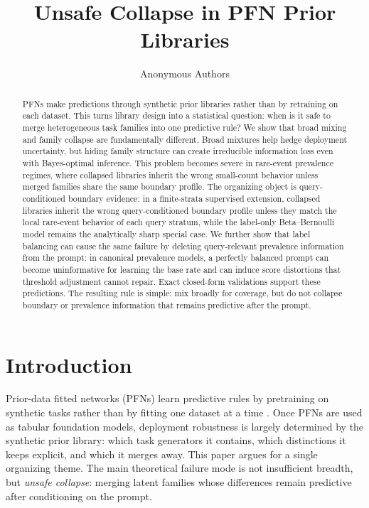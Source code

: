 \documentclass{article}
\title{Unsafe Collapse in PFN Prior Libraries}
\author{Anonymous Authors}
\theoremstyle{definition}
\theoremstyle{remark}
\begin{document}
\maketitle

\begin{abstract}
PFNs make predictions through synthetic prior libraries rather than by retraining on each dataset. This turns library design into a statistical question: when is it safe to merge heterogeneous task families into one predictive rule? We show that broad mixing and family collapse are fundamentally different. Broad mixtures help hedge deployment uncertainty, but hiding family structure can create irreducible information loss even with Bayes-optimal inference. This problem becomes severe in rare-event prevalence regimes, where collapsed libraries inherit the wrong small-count behavior unless merged families share the same boundary profile. The organizing object is query-conditioned boundary evidence: in a finite-strata supervised extension, collapsed libraries inherit the wrong query-conditioned boundary profile unless they match the local rare-event behavior of each query stratum, while the label-only Beta--Bernoulli model remains the analytically sharp special case. We further show that label balancing can cause the same failure by deleting query-relevant prevalence information from the prompt: in canonical prevalence models, a perfectly balanced prompt can become uninformative for learning the base rate and can induce score distortions that threshold adjustment cannot repair. Exact closed-form validations support these predictions. The resulting rule is simple: mix broadly for coverage, but do not collapse boundary or prevalence information that remains predictive after the prompt.
\end{abstract}

\section{Introduction}

Prior-data fitted networks (PFNs) learn predictive rules by pretraining on synthetic tasks rather than by fitting one dataset at a time \citep{muller2022,nagler2023}. Once PFNs are used as tabular foundation models, deployment robustness is largely determined by the synthetic prior library: which task generators it contains, which distinctions it keeps explicit, and which it merges away. This paper argues for a single organizing theme. The main theoretical failure mode is not insufficient breadth, but \emph{unsafe collapse}: merging latent families whose differences remain predictive after conditioning on the prompt.
\end{document}
